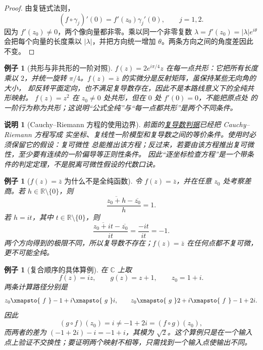 \documentclass[UTF8,fontset=none,a4paper,11pt]{ctexart}
\theoremstyle{foundation-definition}
\theoremstyle{foundation-theorem}
\theoremstyle{foundation-proposition}
\theoremstyle{foundation-example}
\newtheorem{example}[definition]{例子}
\theoremstyle{foundation-remark}
\newtheorem{remark}[definition]{说明}
\theoremstyle{foundation-theorem}
\newcommand{\term}[2]{\hyperref[#1]{#2}}
\begin{document}
\begin{proof}
由复链式法则，
\[
(f\circ\gamma_j)'(0)=f'(z_0)\gamma_j'(0),\qquad j=1,2.
\]
因为 \(f'(z_0)\ne0\)，两个像向量都非零。乘以同一个非零复数
\(\lambda=f'(z_0)=|\lambda|e^{i\theta}\) 会把每个向量的长度乘以
\(|\lambda|\)，并把方向统一增加 \(\theta\)。两条方向之间的角度差因此不变。
\end{proof}

\begin{example}[共形与非共形的一阶对照]
\(f(z)=2e^{i\pi/4}z\) 在每一点共形：它把所有长度乘以 \(2\)，并统一旋转
\(\pi/4\)。\(f(z)=\overline z\) 的实微分是反射矩阵，虽保持某些无向角的大小，
却反转平面定向，也不满足复导数存在，因此不是本路线意义下的全纯共形映射。
\(f(z)=z^2\) 在 \(z_0\ne0\) 处共形，但在 \(0\) 处 \(f'(0)=0\)，不能把原点处
的一阶行为称为共形；这说明“公式全纯”与“每一点都共形”是两个不同条件。
\end{example}

\begin{remark}[Cauchy--Riemann 方程的使用边界]
前面的\term{prop:complex-differential-cr}{复导数判据}已经把 Cauchy--Riemann 方程写成
实坐标、复线性一阶模型和复导数之间的等价条件。使用时必须保留它的假设：复可微性
总能推出该方程；反过来，若要由该方程推出复可微性，至少要有连续的一阶偏导等正则性条件。
因此“逐坐标检查方程”是一个带条件的判定定理，不是脱离可微性假设的代数口诀。
\end{remark}

\begin{example}[\(f(z)=\overline z\) 为什么不是全纯函数]
令 \(f(z)=\overline z\)，并在任意 \(z_0\) 处考察差商。若
\(h\in\mathbb R\setminus\{0\}\)，则
\[
\frac{\overline{z_0+h}-\overline{z_0}}{h}=1.
\]
若 \(h=it\)，其中 \(t\in\mathbb R\setminus\{0\}\)，则
\[
\frac{\overline{z_0+it}-\overline{z_0}}{it}
=\frac{-it}{it}=-1.
\]
两个方向得到的极限不同，所以复导数不存在；\(f(z)=\overline z\)
在任何点都不复可微，更不可能全纯。
\end{example}

\begin{example}[复合顺序的具体算例]\label{ex:complex-composition-concrete}
在 \(\mathbb C\) 上取
\[
f(z)=iz,\qquad g(z)=z+1,\qquad z_0=1+i.
\]
两条计算路径分别是
\[
z_0\xmapsto{\ f\ }-1+i\xmapsto{\ g\ }i,
\qquad
z_0\xmapsto{\ g\ }2+i\xmapsto{\ f\ }-1+2i.
\]
因此
\[
(g\circ f)(z_0)=i\ne-1+2i=(f\circ g)(z_0),
\]
而两者的差为 \((-1+2i)-i=-1+i\)，其模为 \(\sqrt2\)。这个算例只是在一个输入点上验证不交换性；要证明两个映射不相等，只需找到一个输入点使输出不同。
\end{example}
\end{document}
